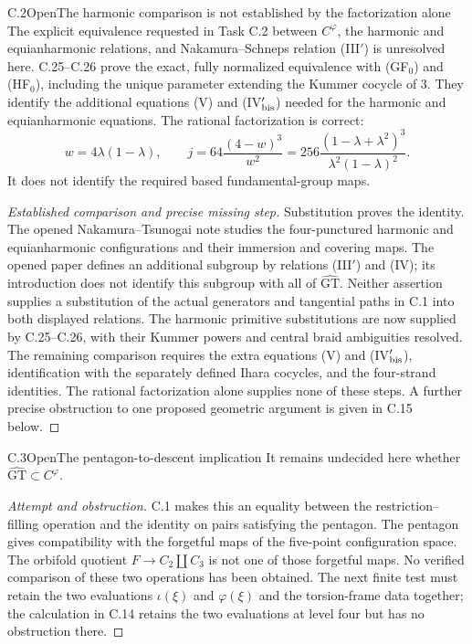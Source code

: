 \begin{statement}{C.2}{Open}{The harmonic comparison is not established by the factorization alone}
The explicit equivalence requested in Task C.2 between
$C^\varphi$, the harmonic and equianharmonic relations, and
Nakamura--Schneps relation (III$'$) is unresolved here.
C.25--C.26 prove the exact, fully normalized equivalence
with (GF$_0$) and (HF$_0$), including the unique parameter
extending the Kummer cocycle of $3$. They identify the
additional equations (V) and (IV$'_{\rm bis}$) needed
for the harmonic and equianharmonic equations.
The rational factorization is correct:
\[
 w=4\lambda(1-\lambda),\qquad
 j=64\frac{(4-w)^3}{w^2}
   =256\frac{(1-\lambda+\lambda^2)^3}{\lambda^2(1-\lambda)^2}.
\]
It does not identify the required based fundamental-group maps.
\end{statement}
\begin{proof}[Established comparison and precise missing step]
Substitution proves the identity. The opened Nakamura--Tsunogai note
\cite{PBC_NT2002} studies the four-punctured harmonic and
equianharmonic configurations and their immersion and covering maps.
The opened paper \cite{PBC_NS2000} defines an additional subgroup by
relations (III$'$) and (IV); its introduction does not identify this
subgroup with all of $\widehat{\mathrm{GT}}$. Neither assertion supplies
a substitution of the actual generators and tangential paths in
C.1 into both displayed relations. The harmonic primitive
substitutions are now supplied by C.25--C.26, with their
Kummer powers and central braid ambiguities resolved.
The remaining comparison requires the extra equations
(V) and (IV$'_{\rm bis}$), identification with the separately
defined Ihara cocycles, and the four-strand identities.
The rational factorization alone supplies none of these steps.
A further precise obstruction to one proposed geometric argument
is given in C.15 below.
\end{proof}

\begin{statement}{C.3}{Open}{The pentagon-to-descent implication}
It remains undecided here whether
$\widehat{\mathrm{GT}}\subset C^\varphi$.
\end{statement}
\begin{proof}[Attempt and obstruction]
C.1 makes this an equality between the restriction--filling operation
and the identity on pairs satisfying the pentagon. The pentagon gives
compatibility with the forgetful maps of the five-point configuration
space. The orbifold quotient $F\to C_2\amalg C_3$ is not one of those
forgetful maps. No verified comparison of these two operations has
been obtained. The next finite test must retain the two evaluations
$\iota(\xi)$ and $\varphi(\xi)$ and the torsion-frame data together;
the calculation in C.14 retains the two evaluations at level four
but has no obstruction there.
\end{proof}

